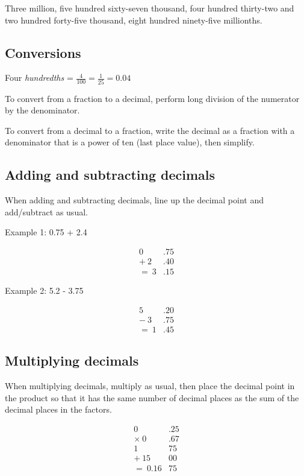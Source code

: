 \documentclass[a4paper, 12pt]{article}
\begin{document}
Three million, five hundred sixty-seven thousand, four hundred thirty-two and two hundred forty-five thousand, eight hundred ninety-five millionths.

\subsection*{Conversions}

Four \textit{hundredths} = $\displaystyle \frac{4}{100} = \frac{1}{25} = 0.04$

To convert from a fraction to a decimal, perform long division of the numerator by the denominator.

To convert from a decimal to a fraction, write the decimal as a fraction with a denominator that is a power of ten (last place value), then simplify.

\subsection*{Adding and subtracting decimals}

When adding and subtracting decimals, line up the decimal point and add/subtract as usual.

Example 1: 0.75 + 2.4

\begin{align*}
0&.75 \\
+ \: 2&.40 \\
= \: 3&.15
\end{align*}

Example 2: 5.2 - 3.75

\begin{align*}
5&.20 \\
- \: 3&.75 \\
= \: 1&.45
\end{align*}

\subsection*{Multiplying decimals}

When multiplying decimals, multiply as usual, then place the decimal point in the product so that it has the same number of decimal places as the sum of the decimal places in the factors.

\begin{align*}
0&.25 \\
\times \: 0&.67 \\
1&75 \\
+ \: 15&00 \\
= \: 0.16&75
\end{align*}
\end{document}
